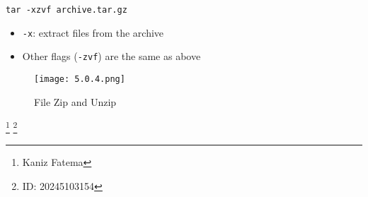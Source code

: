 \documentclass[12pt]{article}
\begin{document}
\begin{verbatim}
tar -xzvf archive.tar.gz
\end{verbatim}

\begin{itemize}
  \item \texttt{-x}: extract files from the archive
  \item Other flags (\texttt{-zvf}) are the same as above
\end{itemize}

\begin{figure}[H] %
    \centering
    \texttt{[image: 5.0.4.png]}
    \caption{File Zip and Unzip}
    \label{kaniz 5.0.4}
\end{figure}

\footnote{Kaniz Fatema }
\footnote{ID: 20245103154 }
\end{document}
